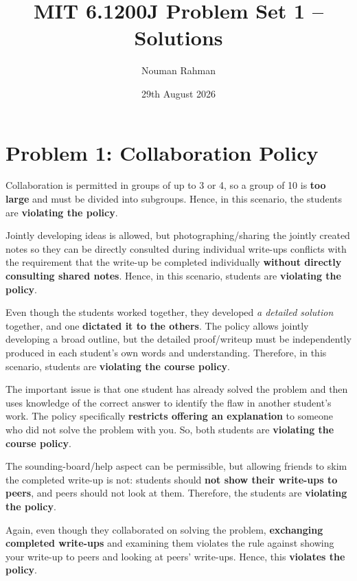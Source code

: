 \documentclass[11pt]{article}
\title{MIT 6.1200J Problem Set 1 – Solutions}
\author{Nouman Rahman}
\date{29th August 2026}
\newcommand{\partlabel}[1]{%
    \noindent\makebox[2em][l]{\textbf{(#1)}}%
}
\begin{document}
\maketitle

\section*{Problem 1: Collaboration Policy}

\partlabel{a}
Collaboration is permitted in groups of up to 3 or 4, so a group of 10 is \textbf{too large} and must be divided into subgroups. Hence, in this scenario, the students are \textbf{violating the policy}.

\medskip

\partlabel{b}
Jointly developing ideas is allowed, but photographing/sharing the jointly created notes so they can be directly consulted during individual write-ups conflicts with the requirement that the write-up be completed individually \textbf{without directly consulting shared notes}. Hence, in this scenario, students are \textbf{violating the policy}.

\medskip

\partlabel{c}
Even though the students worked together, they developed \textit{a detailed solution} together, and one \textbf{dictated it to the others}. The policy allows jointly developing a broad outline, but the detailed proof/writeup must be independently produced in each student's own words and understanding. Therefore, in this scenario, students are \textbf{violating the course policy}.

\medskip

\partlabel{d}
The important issue is that one student has already solved the problem and then uses knowledge of the correct answer to identify the flaw in another student's work. The policy specifically \textbf{restricts offering an explanation} to someone who did not solve the problem with you. So, both students are \textbf{violating the course policy}.

\medskip

\partlabel{e}
The sounding-board/help aspect can be permissible, but allowing friends to skim the completed write-up is not: students should \textbf{not show their write-ups to peers}, and peers should not look at them. Therefore, the students are \textbf{violating the policy}.

\medskip

\partlabel{f}
Again, even though they collaborated on solving the problem, \textbf{exchanging completed write-ups} and examining them violates the rule against showing your write-up to peers and looking at peers' write-ups. Hence, this \textbf{violates the policy}.
\end{document}
